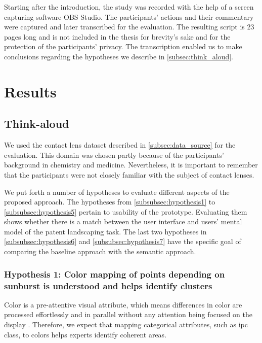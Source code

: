 Starting after the introduction, the study was recorded with the help of a screen capturing software OBS Studio.
The participants' actions and their commentary were captured and later transcribed for the evaluation.
The resulting script is 23 pages long and is not included in the thesis for brevity's sake and for the protection of the participants' privacy.
The transcription enabled us to make conclusions regarding the hypotheses we describe in \autoref{subsec:think_aloud}.

\section{Results}
\label{sec:results}

\subsection{Think-aloud}
\label{subsec:think_aloud}

We used the contact lens dataset described in \autoref{subsec:data_source} for the evaluation.
This domain was chosen partly because of the participants' background in chemistry and medicine.
Nevertheless, it is important to remember that the participants were not closely familiar with the subject of contact lenses.

We put forth a number of hypotheses to evaluate different aspects of the proposed approach.
The hypotheses from \autoref{subsubsec:hypothesis1} to \autoref{subsubsec:hypothesis5} pertain to usability of the prototype.
Evaluating them shows whether there is a match between the user interface and users' mental model of the patent landscaping task.
The last two hypotheses in \autoref{subsubsec:hypothesis6} and \autoref{subsubsec:hypothesis7} have the specific goal of comparing the baseline approach with the semantic approach.

\subsubsection{Hypothesis 1: Color mapping of points depending on sunburst is understood and helps identify clusters}
\label{subsubsec:hypothesis1}

Color is a pre-attentive visual attribute, which means differences in color are processed effortlessly and in parallel without any attention being focused on the display \cite{Treisman1985}.
Therefore, we expect that mapping categorical attributes, such as \gls{ipc} class, to colors helps experts identify coherent areas.

